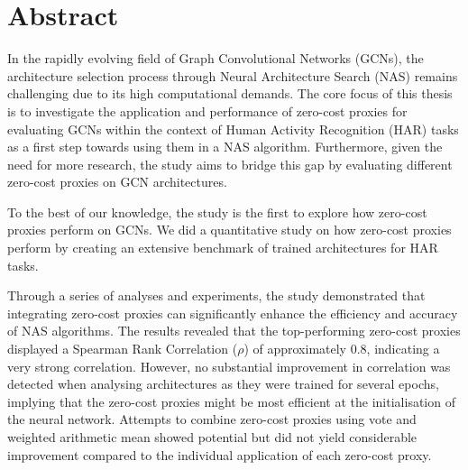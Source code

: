 \chapter*{Abstract}

In the rapidly evolving field of Graph Convolutional Networks (GCNs), the architecture selection process through Neural Architecture Search (NAS) remains challenging due to its high computational demands. The core focus of this thesis is to investigate the application and performance of zero-cost proxies for evaluating GCNs within the context of Human Activity Recognition (HAR) tasks as a first step towards using them in a NAS algorithm. Furthermore, given the need for more research, the study aims to bridge this gap by evaluating different zero-cost proxies on GCN architectures. 

To the best of our knowledge, the study is the first to explore how zero-cost proxies perform on GCNs. We did a quantitative study on how zero-cost proxies perform by creating an extensive benchmark of trained architectures for HAR tasks.

Through a series of analyses and experiments, the study demonstrated that integrating zero-cost proxies can significantly enhance the efficiency and accuracy of NAS algorithms. The results revealed that the top-performing zero-cost proxies displayed a Spearman Rank Correlation ($\rho$) of approximately $0.8$, indicating a very strong correlation. However, no substantial improvement in correlation was detected when analysing architectures as they were trained for several epochs, implying that the zero-cost proxies might be most efficient at the initialisation of the neural network. Attempts to combine zero-cost proxies using vote and weighted arithmetic mean showed potential but did not yield considerable improvement compared to the individual application of each zero-cost proxy. 